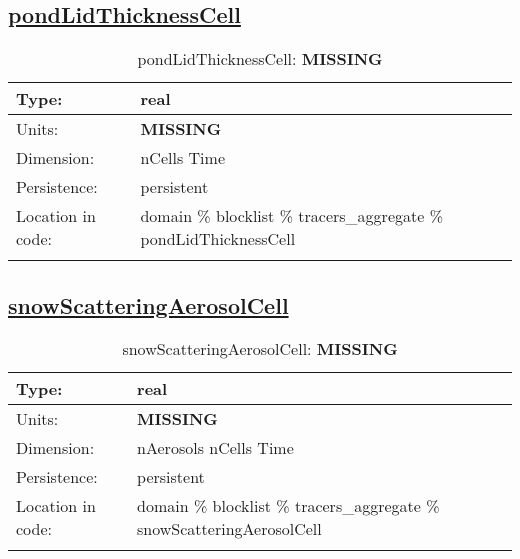 \subsection[pondLidThicknessCell]{\hyperref[sec:var_tab_tracers_aggregate]{pondLidThicknessCell}}
\label{subsec:var_sec_tracers_aggregate_pondLidThicknessCell}
\begin{center}
\begin{longtable}{| p{2.0in} | p{4.0in} |}
        \hline 
        Type: & real \\
        \hline 
        Units: & {\bf \color{red} MISSING} \\
        \hline 
        Dimension: & nCells Time \\
        \hline 
        Persistence: & persistent \\
        \hline 
         Location in code: & domain \% blocklist \% tracers\_aggregate \% pondLidThicknessCell \\
         \hline 
    \caption{pondLidThicknessCell: {\bf \color{red} MISSING}}
\end{longtable}
\end{center}
\subsection[snowScatteringAerosolCell]{\hyperref[sec:var_tab_tracers_aggregate]{snowScatteringAerosolCell}}
\label{subsec:var_sec_tracers_aggregate_snowScatteringAerosolCell}
\begin{center}
\begin{longtable}{| p{2.0in} | p{4.0in} |}
        \hline 
        Type: & real \\
        \hline 
        Units: & {\bf \color{red} MISSING} \\
        \hline 
        Dimension: & nAerosols nCells Time \\
        \hline 
        Persistence: & persistent \\
        \hline 
         Location in code: & domain \% blocklist \% tracers\_aggregate \% snowScatteringAerosolCell \\
         \hline 
    \caption{snowScatteringAerosolCell: {\bf \color{red} MISSING}}
\end{longtable}
\end{center}
